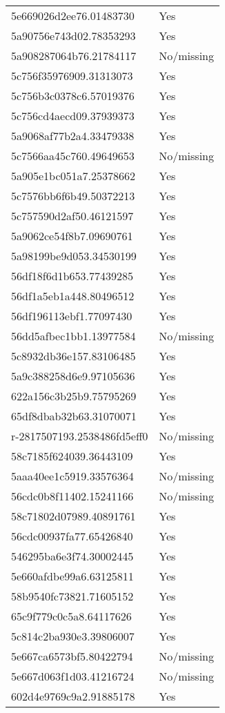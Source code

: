\begin{tabular}{ll}
5e669026d2ee76.01483730 & Yes \\
5a90756e743d02.78353293 & Yes \\
5a908287064b76.21784117 & No/missing \\
5c756f35976909.31313073 & Yes \\
5c756b3c0378c6.57019376 & Yes \\
5c756cd4aecd09.37939373 & Yes \\
5a9068af77b2a4.33479338 & Yes \\
5c7566aa45c760.49649653 & No/missing \\
5a905e1bc051a7.25378662 & Yes \\
5c7576bb6f6b49.50372213 & Yes \\
5c757590d2af50.46121597 & Yes \\
5a9062ce54f8b7.09690761 & Yes \\
5a98199be9d053.34530199 & Yes \\
56df18f6d1b653.77439285 & Yes \\
56df1a5eb1a448.80496512 & Yes \\
56df196113ebf1.77097430 & Yes \\
56dd5afbec1bb1.13977584 & No/missing \\
5c8932db36e157.83106485 & Yes \\
5a9c388258d6e9.97105636 & Yes \\
622a156c3b25b9.75795269 & Yes \\
65df8dbab32b63.31070071 & Yes \\
r-2817507193.2538486fd5eff0 & No/missing \\
58c7185f624039.36443109 & Yes \\
5aaa40ee1c5919.33576364 & No/missing \\
56cdc0b8f11402.15241166 & No/missing \\
58c71802d07989.40891761 & Yes \\
56cdc00937fa77.65426840 & Yes \\
546295ba6e3f74.30002445 & Yes \\
5e660afdbe99a6.63125811 & Yes \\
58b9540fc73821.71605152 & Yes \\
65c9f779c0c5a8.64117626 & Yes \\
5c814c2ba930e3.39806007 & Yes \\
5e667ca6573bf5.80422794 & No/missing \\
5e667d063f1d03.41216724 & No/missing \\
602d4e9769c9a2.91885178 & Yes \\

\end{tabular}
